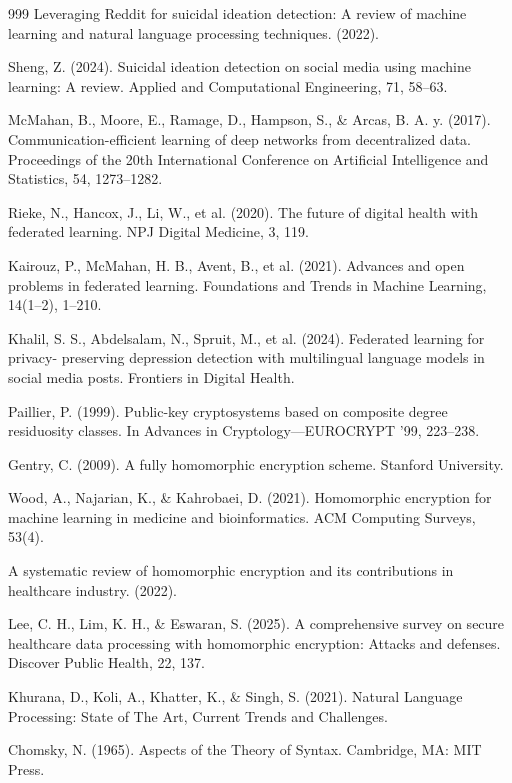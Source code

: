 \begin{thebibliography}{999}
 Leveraging Reddit for suicidal ideation detection: A review of machine learning and natural language processing techniques. (2022).

 Sheng, Z. (2024). Suicidal ideation detection on social media using machine learning: A review. Applied and Computational Engineering, 71, 58–63.

 McMahan, B., Moore, E., Ramage, D., Hampson, S., \& Arcas, B. A. y. (2017). Communication-efficient learning of deep networks from decentralized data. Proceedings of the 20th International Conference on Artificial Intelligence and Statistics, 54, 1273–1282.

 Rieke, N., Hancox, J., Li, W., et al. (2020). The future of digital health with federated learning. NPJ Digital Medicine, 3, 119.

 Kairouz, P., McMahan, H. B., Avent, B., et al. (2021). Advances and open problems in federated learning. Foundations and Trends in Machine Learning, 14(1–2), 1–210.

 Khalil, S. S., Abdelsalam, N., Spruit, M., et al. (2024). Federated learning for privacy- preserving depression detection with multilingual language models in social media posts. Frontiers in Digital Health.

 Paillier, P. (1999). Public-key cryptosystems based on composite degree residuosity classes. In Advances in Cryptology—EUROCRYPT ’99, 223–238.

 Gentry, C. (2009). A fully homomorphic encryption scheme. Stanford University.

 Wood, A., Najarian, K., \& Kahrobaei, D. (2021). Homomorphic encryption for machine learning in medicine and bioinformatics. ACM Computing Surveys, 53(4).

 A systematic review of homomorphic encryption and its contributions in healthcare industry. (2022).

 Lee, C. H., Lim, K. H., \& Eswaran, S. (2025). A comprehensive survey on secure healthcare data processing with homomorphic encryption: Attacks and defenses. Discover Public Health, 22, 137.

 Khurana, D., Koli, A., Khatter, K., \& Singh, S. (2021). Natural Language Processing: State of The Art, Current Trends and Challenges.

 Chomsky, N. (1965). Aspects of the Theory of Syntax. Cambridge, MA: MIT Press.


\end{thebibliography}

